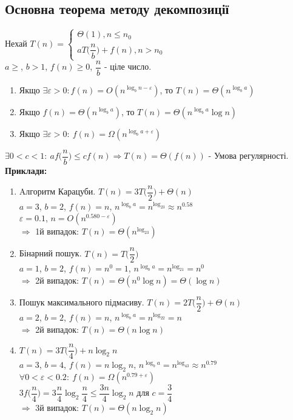 \documentclass[a4paper,12pt]{article}
\begin{document}
    \subsection{Основна теорема методу декомпозиції}
    Нехай $T(n)=\begin{cases}
        \Theta(1), n\leqslant n_0 \\
        aT\biggl(\dfrac{n}{b}\biggr)+f(n), n>n_0
    \end{cases}$ \\
    $a\geqslant$, $b>1$, $f(n)\geqslant0$, $\dfrac{n}{b}$ - ціле число.
    \begin{enumerate}
        \item Якщо $\exists\varepsilon>0: f(n)=O(n^{\log_bn-\varepsilon})$, то $T(n)=\Theta(n^{\log_ba})$
        \item Якщо $f(n)=\Theta(n^{\log_ba})$, то $T(n)=\Theta(n^{\log_ba}\log n)$
        \item Якщо $\exists \varepsilon>0:\: f(n)=\Omega(n^{\log_ba+\varepsilon})$
    \end{enumerate}
    $\exists0<c<1:\: af\Biggl(\dfrac{n}{b}\Biggr)\leqslant cf(n)\Rightarrow T(n)=\Theta(f(n))$ - Умова регулярності. \\
    \textbf{Приклади:}
    \begin{enumerate}
        \item Aлгоритм Карацуби. $T(n)=3T\Biggl(\dfrac{n}{2}\Biggr)+\Theta(n)$ \\
        $a=3$, $b=2$, $f(n)=n$, $n^{\log_ba}=n^{\log_23}\approx n^{0.58}$ \\
        $\varepsilon=0.1$, $n=O(n^{0.580-\varepsilon})$ \\
        $\Rightarrow$ 1й випадок: $T(n)=\Theta(n^{\log_23})$
        \item Бінарний пошук. $T(n)=T\Biggl(\dfrac{n}{2}\Biggr)$ \\
        $a=1$, $b=2$, $f(n)=n^0=1$, $n^{\log_ba}=n^{\log_21}=n^0$ \\
        $\Rightarrow$ 2й випадок: $T(n)=\Theta(n^0\log n)=\Theta(\log n)$
        \item Пошук максимального підмасиву. $T(n)=2T\Biggl(\dfrac{n}{2}\Biggr)+\Theta(n)$ \\
        $a=2$, $b=2$, $f(n)=n$, $n^{\log_ba}=n^{\log_22}=n$ \\
        $\Rightarrow$ 2й випадок: $T(n)=\Theta(n\log n)$ 
        \item $T(n)=3T\Biggl(\dfrac{n}{4}\Biggr)+n\log_2n$ \\
        $a=3$, $b=4$, $f(n)=n\log_2n$, $n^{\log_ba}=n^{\log_43}\approx n^{0.79}$ \\
        $\forall 0<\varepsilon<0.2:\: f(n)=\Omega(n^{0.79+\varepsilon})$ \\
        $3f\Biggl(\dfrac{n}{4}\Biggr)=3\dfrac{n}{4}\log_2\dfrac{n}{4}\leqslant\dfrac{3n}{4}\log_2n$ для $c=\dfrac{3}{4}$ \\
        $\Rightarrow$ 3й випадок: $T(n)=\Theta(n\log_2n)$
    \end{enumerate}
\end{document}

